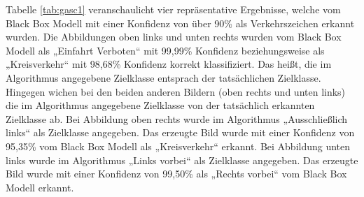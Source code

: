 Tabelle \ref{tab:gasc1} veranschaulicht vier repräsentative Ergebnisse, welche vom Black Box Modell mit einer Konfidenz von über 90\% als Verkehrszeichen erkannt wurden. Die Abbildungen oben links und unten rechts wurden vom Black Box Modell als „Einfahrt Verboten“ mit 99,99\% Konfidenz beziehungsweise als „Kreisverkehr“ mit 98,68\% Konfidenz korrekt klassifiziert. 
Das heißt, die im Algorithmus angegebene Zielklasse entsprach der tatsächlichen Zielklasse.
Hingegen wichen bei den beiden anderen Bildern (oben rechts und unten links) die im Algorithmus angegebene Zielklasse von der tatsächlich erkannten Zielklasse ab. 
Bei Abbildung oben rechts wurde im Algorithmus „Ausschließlich links“ als Zielklasse angegeben. Das erzeugte Bild wurde mit einer Konfidenz von 95,35\% vom Black Box Modell als „Kreisverkehr“ erkannt.
Bei Abbildung unten links wurde im Algorithmus „Links vorbei“ als Zielklasse angegeben. Das erzeugte Bild wurde mit einer Konfidenz von 99,50\% als „Rechts vorbei“ vom Black Box Modell erkannt.


